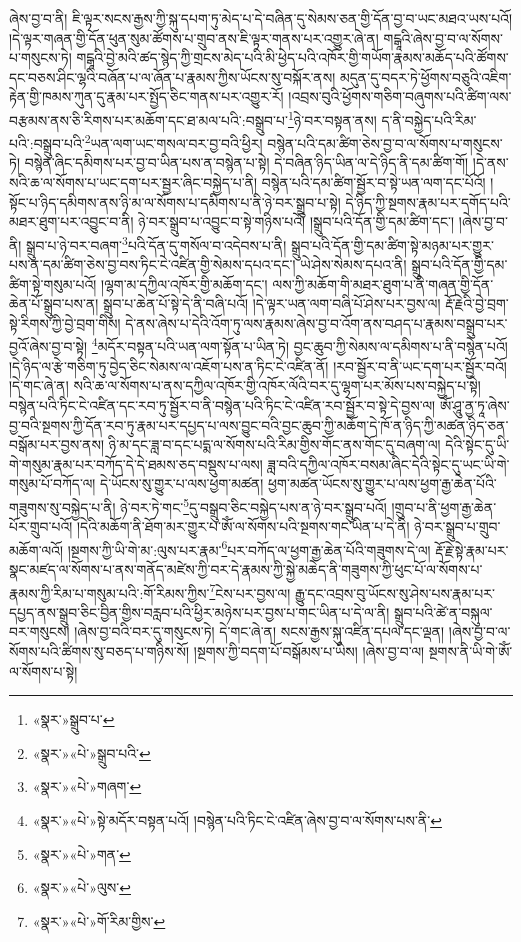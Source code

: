 ཞེས་བྱ་བ་ནི། ཇི་ལྟར་སངས་རྒྱས་ཀྱི་སྐུ་དཔག་ཏུ་མེད་པ་དེ་བཞིན་དུ་སེམས་ཅན་གྱི་དོན་བྱ་བ་ཡང་མཐའ་ཡས་པའོ། །དེ་ལྟར་གཞན་གྱི་དོན་ཕུན་སུམ་ཚོགས་པ་གྲུབ་ནས་ཇི་ལྟར་གནས་པར་འགྱུར་ཞེ་ན། གངྒཱའི་ཞེས་བྱ་བ་ལ་སོགས་པ་གསུངས་ཏེ། གངྒཱའི་བྱེ་མའི་ཚད་སྙེད་ཀྱི་གྲངས་མེད་པའི་མི་ཕྱེད་པའི་འཁོར་གྱི་གཡོག་རྣམས་མཆོད་པའི་ཚོགས་དང་བཅས་ཤིང་ལྷའི་བཞོན་པ་ལ་ཞོན་པ་རྣམས་ཀྱིས་ཡོངས་སུ་བསྐོར་ནས། མདུན་དུ་བདར་ཏེ་ཕྱོགས་བཅུའི་འཇིག་རྟེན་གྱི་ཁམས་ཀུན་དུ་རྣམ་པར་སྤྱོད་ཅིང་གནས་པར་འགྱུར་རོ། །འབྲས་བུའི་ཕྱོགས་གཅིག་བཞུགས་པའི་ཚིག་ལས་བརྩམས་ནས་ཅི་རིགས་པར་མཆོག་དང་ཐ་མལ་པའི་:བསྒྲུབ་པ་\footnote{«སྣར་»སྒྲུབ་པ་}ཉེ་བར་བསྟན་ནས། ད་ནི་བསྐྱེད་པའི་རིམ་པའི་:བསྒྲུབ་པའི་\footnote{«སྣར་»«པེ་»སྒྲུབ་པའི་}ཡན་ལག་ཡང་གསལ་བར་བྱ་བའི་ཕྱིར། བསྙེན་པའི་དམ་ཚིག་ཅེས་བྱ་བ་ལ་སོགས་པ་གསུངས་ཏེ། བསྙེན་ཞིང་དམིགས་པར་བྱ་བ་ཡིན་པས་ན་བསྙེན་པ་སྟེ། དེ་བཞིན་ཉིད་ཡིན་ལ་དེ་ཉིད་ནི་དམ་ཚིག་གོ། །དེ་ནས་སའི་ཆ་ལ་སོགས་པ་ཡང་དག་པར་སྦྱར་ཞིང་བསྐྱེད་པ་ནི། བསྙེན་པའི་དམ་ཚིག་སྦྱོར་བ་སྟེ་ཡན་ལག་དང་པོའོ། །སྟོང་པ་ཉིད་དམིགས་ནས་ཉི་མ་ལ་སོགས་པ་དམིགས་པ་ནི་ཉེ་བར་སྒྲུབ་པ་སྟེ། དེ་ཉིད་ཀྱི་སྔགས་རྣམ་པར་དགོད་པའི་མཐར་ཐུག་པར་འབྱུང་བ་ནི། ཉེ་བར་སྒྲུབ་པ་འབྱུང་བ་སྟེ་གཉིས་པའོ། །སྒྲུབ་པའི་དོན་གྱི་དམ་ཚིག་དང་། །ཞེས་བྱ་བ་ནི། སྒྲུབ་པ་ཉེ་བར་བཞག་\footnote{«སྣར་»«པེ་»གཞག་}པའི་དོན་དུ་གསོལ་བ་འདེབས་པ་ནི། སྒྲུབ་པའི་དོན་གྱི་དམ་ཚིག་སྟེ་མཉམ་པར་གྱུར་པས་ན་དམ་ཚིག་ཅེས་བྱ་བས་ཏིང་ངེ་འཛིན་གྱི་སེམས་དཔའ་དང་། ཡེ་ཤེས་སེམས་དཔའ་ནི། སྒྲུབ་པའི་དོན་གྱི་དམ་ཚིག་སྟེ་གསུམ་པའོ། །ལྷག་མ་དཀྱིལ་འཁོར་གྱི་མཆོག་དང་། ལས་ཀྱི་མཆོག་གི་མཐར་ཐུག་པ་ནི་གཞན་གྱི་དོན་ཆེན་པོ་སྒྲུབ་པས་ན། སྒྲུབ་པ་ཆེན་པོ་སྟེ་དེ་ནི་བཞི་པའོ། །དེ་ལྟར་ཡན་ལག་བཞི་པོ་ཤེས་པར་བྱས་ལ། རྡོ་རྗེའི་བྱེ་བྲག་སྟེ་རིགས་ཀྱི་བྱེ་བྲག་གིས། དེ་ནས་ཞེས་པ་དེའི་འོག་ཏུ་ལས་རྣམས་ཞེས་བྱ་བ་འོག་ནས་བཤད་པ་རྣམས་བསྒྲུབ་པར་བྱའོ་ཞེས་བྱ་བ་སྟེ། \footnote{«སྣར་»«པེ་»སྟེ་མདོར་བསྟན་པའོ། །བསྙེན་པའི་ཏིང་ངེ་འཛིན་ཞེས་བྱ་བ་ལ་སོགས་པས་ནི་}མདོར་བསྟན་པའི་ཡན་ལག་སྟོན་པ་ཡིན་ཏེ། བྱང་ཆུབ་ཀྱི་སེམས་ལ་དམིགས་པ་ནི་བསྙེན་པའོ། །དེ་ཉིད་ལ་རྩེ་གཅིག་ཏུ་བྱེད་ཅིང་སེམས་ལ་འཇོག་པས་ན་ཏིང་ངེ་འཛིན་ནོ། །རབ་སྦྱོར་བ་ནི་ཡང་དག་པར་སྦྱོར་བའོ། །དེ་གང་ཞེ་ན། སའི་ཆ་ལ་སོགས་པ་ནས་དཀྱིལ་འཁོར་གྱི་འཁོར་ལོའི་བར་དུ་ལྷག་པར་མོས་པས་བསྐྱེད་པ་སྟེ། བསྙེན་པའི་ཏིང་ངེ་འཛིན་དང་རབ་ཏུ་སྦྱོར་བ་ནི་བསྙེན་པའི་ཏིང་ངེ་འཛིན་རབ་སྦྱོར་བ་སྟེ་དེ་བྱས་ལ། ཨོཾ་ཤཱུ་ནྱ་ཏཱ་ཞེས་བྱ་བའི་སྔགས་ཀྱི་དོན་རབ་ཏུ་རྣམ་པར་དཔྱད་པ་ལས་བྱུང་བའི་བྱང་ཆུབ་ཀྱི་མཆོག་དེ་ཁོ་ན་ཉིད་ཀྱི་མཚན་ཉིད་ཅན་བསྒོམ་པར་བྱས་ནས། ཉི་མ་དང་ཟླ་བ་དང་པདྨ་ལ་སོགས་པའི་རིམ་གྱིས་གོང་ནས་གོང་དུ་བཞག་ལ། དེའི་སྟེང་དུ་ཡི་གེ་གསུམ་རྣམ་པར་བཀོད་དེ་དེ་ཐམས་ཅད་བསྡུས་པ་ལས། ཟླ་བའི་དཀྱིལ་འཁོར་བསམ་ཞིང་དེའི་སྟེང་དུ་ཡང་ཡི་གེ་གསུམ་པོ་བཀོད་ལ། དེ་ཡོངས་སུ་གྱུར་པ་ལས་ཕྱག་མཚན། ཕྱག་མཚན་ཡོངས་སུ་གྱུར་པ་ལས་ཕྱག་རྒྱ་ཆེན་པོའི་གཟུགས་སུ་བསྐྱེད་པ་ནི། ཉེ་བར་ཏེ་གང་\footnote{«སྣར་»«པེ་»གན་}དུ་བསྒྲུབ་ཅིང་བསྐྱེད་པས་ན་ཉེ་བར་སྒྲུབ་པའོ། །གྲུབ་པ་ནི་ཕྱག་རྒྱ་ཆེན་པོར་གྲུབ་པའོ། །དེའི་མཆོག་ནི་ཐོག་མར་གྱུར་པ་ཨོཾ་ལ་སོགས་པའི་སྔགས་གང་ཡིན་པ་དེ་ནི། ཉེ་བར་སྒྲུབ་པ་གྲུབ་མཆོག་ལའོ། །སྔགས་ཀྱི་ཡི་གེ་མ་:ལུས་པར་རྣམ་\footnote{«སྣར་»«པེ་»ལུས་}པར་བཀོད་ལ་ཕྱག་རྒྱ་ཆེན་པོའི་གཟུགས་དེ་ལ། རྡོ་རྗེ་སྟེ་རྣམ་པར་སྣང་མཛད་ལ་སོགས་པ་ནས་གནོད་མཛེས་ཀྱི་བར་དེ་རྣམས་ཀྱི་སྐྱེ་མཆེད་ནི་གཟུགས་ཀྱི་ཕུང་པོ་ལ་སོགས་པ་རྣམས་ཀྱི་རིམ་པ་གསུམ་པའི་:གོ་རིམས་ཀྱིས་\footnote{«སྣར་»«པེ་»གོ་རིམ་གྱིས་}ངེས་པར་བྱས་ལ། རྒྱུ་དང་འབྲས་བུ་ཡོངས་སུ་ཤེས་པས་རྣམ་པར་དཔྱད་ནས་སྒྲུབ་ཅིང་བྱིན་གྱིས་བརླབ་པའི་ཕྱིར་མཉེས་པར་བྱས་པ་གང་ཡིན་པ་དེ་ལ་ནི། སྒྲུབ་པའི་ཚེ་ན་བསྐུལ་བར་གསུངས། །ཞེས་བྱ་བའི་བར་དུ་གསུངས་ཏེ། དེ་གང་ཞེ་ན། སངས་རྒྱས་སྐུ་འཛིན་དཔལ་དང་ལྡན། །ཞེས་བྱ་བ་ལ་སོགས་པའི་ཚིགས་སུ་བཅད་པ་གཉིས་སོ། །སྔགས་ཀྱི་བདག་པོ་བསྒོམས་པ་ཡིས། །ཞེས་བྱ་བ་ལ། སྔགས་ནི་ཡི་གེ་ཨོཾ་ལ་སོགས་པ་སྟེ། 